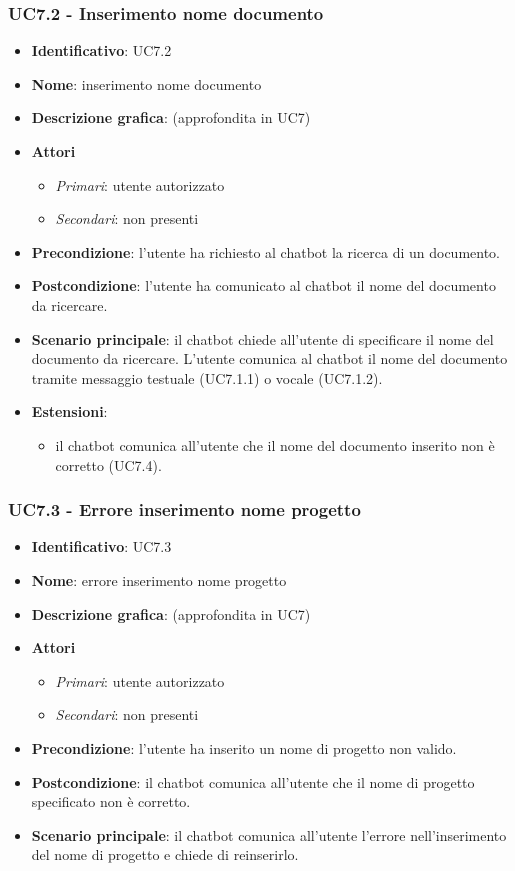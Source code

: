 \subsubsection{UC7.2 - Inserimento nome documento}
\begin{itemize}
    \item \textbf{Identificativo}: UC7.2
    \item \textbf{Nome}: inserimento nome documento
    \item \textbf{Descrizione grafica}: (approfondita in UC7)
    \item \textbf{Attori}
 \begin{itemize} 
    \item \textit{Primari}: utente autorizzato
    \item \textit{Secondari}: non presenti
 \end{itemize}
 \item \textbf{Precondizione}: l'utente ha richiesto al chatbot la ricerca di un documento.
 \item \textbf{Postcondizione}:  l'utente ha comunicato al chatbot il nome del documento da ricercare.
 \item \textbf{Scenario principale}: il chatbot chiede all'utente di specificare il nome del documento da ricercare. L'utente comunica al chatbot il nome del documento tramite messaggio testuale (UC7.1.1) o vocale (UC7.1.2).
 \item \textbf{Estensioni}: 
\begin{itemize} 
    \item il chatbot comunica all'utente che il nome del documento inserito non è corretto (UC7.4).
 \end{itemize}
\end{itemize}
\subsubsection{UC7.3 - Errore inserimento nome progetto}
\begin{itemize}
    \item \textbf{Identificativo}: UC7.3
    \item \textbf{Nome}: errore inserimento nome progetto
    \item \textbf{Descrizione grafica}: (approfondita in UC7)
    \item \textbf{Attori}
 \begin{itemize} 
    \item \textit{Primari}: utente autorizzato
    \item \textit{Secondari}: non presenti
 \end{itemize}
 \item \textbf{Precondizione}: l'utente ha inserito un nome di progetto non valido.
 \item \textbf{Postcondizione}:  il chatbot comunica all'utente che il nome di progetto specificato non è corretto.
 \item \textbf{Scenario principale}: il chatbot comunica all'utente l'errore nell'inserimento del nome di progetto e chiede di reinserirlo.
\end{itemize}
